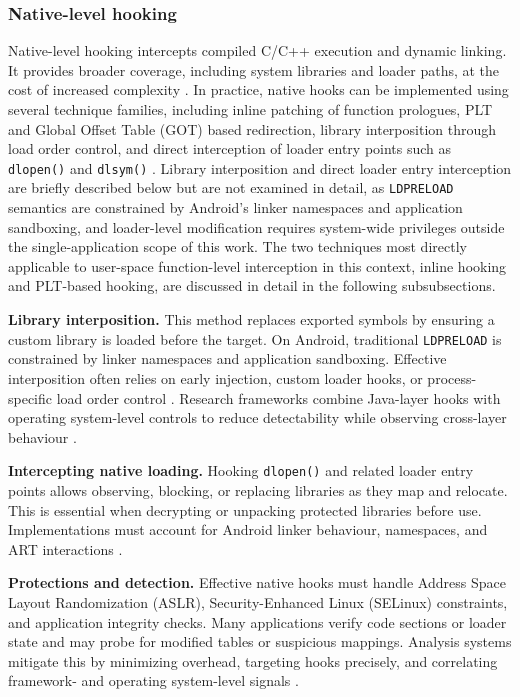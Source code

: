 \documentclass[11pt,a4paper]{report}
\renewcommand\_{{\textunderscore\allowbreak}}
\begin{document}
\subsubsection{Native-level hooking}

Native-level hooking intercepts compiled C/C++ execution and dynamic linking. It provides broader coverage, including system libraries and loader paths, at the cost of increased complexity \cite{ronin2018hooking}. In practice, native hooks can be implemented using several technique families, including inline patching of function prologues, PLT and Global Offset Table (GOT) based redirection, library interposition through load order control, and direct interception of loader entry points such as \texttt{dlopen()} and \texttt{dlsym()} \cite{ronin2018hooking,kumar2023inviseal}. Library interposition and direct loader entry interception are briefly described below but are not examined in detail, as \texttt{LD\_PRELOAD} semantics are constrained by Android's linker namespaces and application sandboxing, and loader-level modification requires system-wide privileges outside the single-application scope of this work. The two techniques most directly applicable to user-space function-level interception in this context, inline hooking and PLT-based hooking, are discussed in detail in the following subsubsections.

\textbf{Library interposition.} This method replaces exported symbols by ensuring a custom library is loaded before the target. On Android, traditional \texttt{LD\_PRELOAD} is constrained by linker namespaces and application sandboxing. Effective interposition often relies on early injection, custom loader hooks, or process-specific load order control \cite{ronin2018hooking}. Research frameworks combine Java-layer hooks with operating system-level controls to reduce detectability while observing cross-layer behaviour \cite{kumar2023inviseal}.

\textbf{Intercepting native loading.} Hooking \texttt{dlopen()} and related loader entry points allows observing, blocking, or replacing libraries as they map and relocate. This is essential when decrypting or unpacking protected libraries before use. Implementations must account for Android linker behaviour, namespaces, and ART interactions \cite{ronin2018hooking,bleier2023oat}.

\textbf{Protections and detection.} Effective native hooks must handle Address Space Layout Randomization (ASLR), Security-Enhanced Linux (SELinux) constraints, and application integrity checks. Many applications verify code sections or loader state and may probe for modified tables or suspicious mappings. Analysis systems mitigate this by minimizing overhead, targeting hooks precisely, and correlating framework- and operating system-level signals \cite{kumar2023inviseal,ronin2018hooking}.
\end{document}
